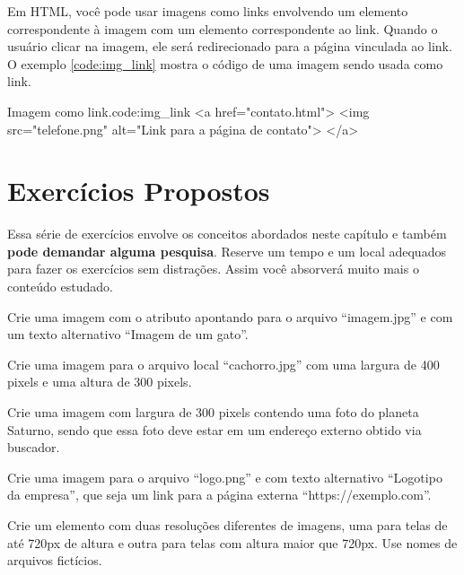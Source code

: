 Em HTML, você pode usar imagens como links envolvendo um elemento  correspondente à imagem com um elemento  correspondente ao link. Quando o usuário clicar na imagem, ele será redirecionado para a página vinculada ao link. O exemplo \ref{code:img_link} mostra o código de uma imagem sendo usada como link.

\begin{htmlcode}{Imagem como link.}{code:img_link}
<a href="contato.html">
  <img src="telefone.png" alt="Link para a página de contato">
</a>
\end{htmlcode}

\section{Exercícios Propostos}

Essa série de exercícios envolve os conceitos abordados neste capítulo e também \textbf{pode demandar alguma pesquisa}. Reserve um tempo e um local adequados para fazer os exercícios sem distrações. Assim você absorverá muito mais o conteúdo estudado.

\begin{exercise}
Crie uma imagem com o atributo  apontando para o arquivo ``imagem.jpg'' e com um texto alternativo ``Imagem de um gato''.
\end{exercise}

\begin{exercise}
Crie uma imagem para o arquivo local ``cachorro.jpg'' com uma largura de 400 pixels e uma altura de 300 pixels.
\end{exercise}

\begin{exercise}
Crie uma imagem com largura de 300 pixels contendo uma foto do planeta Saturno, sendo que essa foto deve estar em um endereço externo obtido via buscador.
\end{exercise}

\begin{exercise}
Crie uma imagem para o arquivo ``logo.png'' e com texto alternativo ``Logotipo da empresa'', que seja um link para a página externa ``https://exemplo.com''.
\end{exercise}

\begin{exercise}
Crie um elemento  com duas resoluções diferentes de imagens, uma para telas de até 720px de altura e outra para telas com altura maior que 720px. Use nomes de arquivos fictícios.
\end{exercise}

